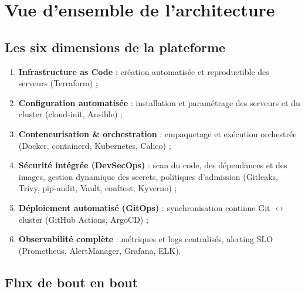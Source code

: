 \documentclass[12pt,a4paper,oneside]{report}
\begin{document}
\section{Vue d'ensemble de l'architecture}

\subsection{Les six dimensions de la plateforme}

\begin{enumerate}[itemsep=2pt]
  \item \textbf{Infrastructure as Code} : création automatisée et reproductible des serveurs (Terraform) ;
  \item \textbf{Configuration automatisée} : installation et paramétrage des serveurs et du cluster (cloud-init, Ansible) ;
  \item \textbf{Conteneurisation \& orchestration} : empaquetage et exécution orchestrée (Docker, containerd, Kubernetes, Calico) ;
  \item \textbf{Sécurité intégrée (DevSecOps)} : scan du code, des dépendances et des images, gestion dynamique des secrets, politiques d'admission (Gitleaks, Trivy, pip-audit, Vault, conftest, Kyverno) ;
  \item \textbf{Déploiement automatisé (GitOps)} : synchronisation continue Git $\leftrightarrow$ cluster (GitHub Actions, ArgoCD) ;
  \item \textbf{Observabilité complète} : métriques et logs centralisés, alerting SLO (Prometheus, AlertManager, Grafana, ELK).
\end{enumerate}

\subsection{Flux de bout en bout}
\end{document}

